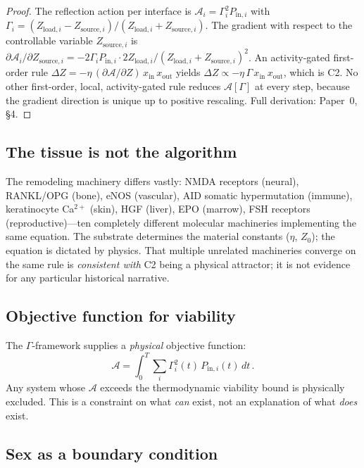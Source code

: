 \documentclass[aps,pre,twocolumn,superscriptaddress,floatfix]{revtex4-2}
\begin{document}
\begin{proof}
The reflection action per interface is
$\mathcal{A}_i = \Gamma_i^2 P_{\text{in},i}$ with
$\Gamma_i = (Z_{\text{load},i} - Z_{\text{source},i}) /
(Z_{\text{load},i} + Z_{\text{source},i})$.
The gradient with respect to the controllable variable
$Z_{\text{source},i}$ is
$\partial\mathcal{A}_i / \partial Z_{\text{source},i}
 = -2\Gamma_i P_{\text{in},i} \cdot
     2 Z_{\text{load},i} / (Z_{\text{load},i} +
     Z_{\text{source},i})^2$.
An activity-gated first-order rule
$\Delta Z = -\eta\,(\partial\mathcal{A}/\partial Z)\,
 x_{\text{in}}\,x_{\text{out}}$ yields
$\Delta Z \propto -\eta\,\Gamma\,x_{\text{in}}\,
 x_{\text{out}}$,
which is C2.
No other first-order, local, activity-gated rule
reduces $\mathcal{A}[\Gamma]$ at every step, because
the gradient direction is unique up to positive
rescaling.
Full derivation: Paper~0, \S4.
\end{proof}

\subsection{The tissue is not the algorithm}

The remodeling machinery differs vastly: NMDA receptors
(neural), RANKL/OPG (bone), eNOS (vascular),
AID somatic hypermutation (immune), keratinocyte Ca$^{2+}$
(skin), HGF (liver), EPO (marrow), FSH receptors
(reproductive)---ten completely different molecular
machineries implementing the same equation.
The substrate determines the material constants
($\eta$, $Z_0$); the equation is dictated by physics.
That multiple unrelated machineries converge on the
same rule is \emph{consistent with} C2 being a
physical attractor; it is not evidence for any
particular historical narrative.

\subsection{Objective function for viability}

The $\Gamma$-framework supplies a \emph{physical}
objective function:
\begin{equation}
  \mathcal{A} = \int_0^T \sum_i \Gamma_i^2(t)\,
  P_{\text{in},i}(t)\,dt\,.
\end{equation}
Any system whose $\mathcal{A}$ exceeds the
thermodynamic viability bound is physically excluded.
This is a constraint on what \emph{can} exist, not
an explanation of what \emph{does} exist.

\subsection{Sex as a boundary condition}
\end{document}
